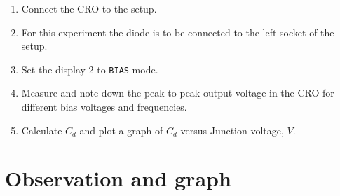 \begin{enumerate}
	\item 	Connect the CRO to the setup.
	\item 	For this experiment the diode is to be connected to the left socket of the setup.
	\item 	Set the display 2 to \texttt{BIAS} mode.
	\item 	Measure and note down the peak to peak output voltage in the CRO for different bias voltages and frequencies.
	\item  	Calculate $ C_d $ and plot a graph of $ C_d $ versus Junction voltage, $ V $.
	
\end{enumerate}

\section{Observation and graph}

